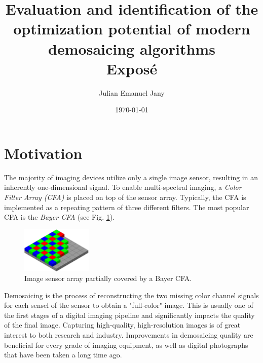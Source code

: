 \documentclass[english,notitlepage,smartquotes]{hgbreport}
\author{Julian Emanuel Jany}                     %
\title{Evaluation and identification of the optimization potential of modern demosaicing algorithms \\ %
			 \textbf{Exposé}}
\date{\today}
\begin{document}
\maketitle



\section{Motivation}

The majority of imaging devices utilize only a single image sensor, resulting in an inherently one-dimensional signal. 
To enable multi-spectral imaging, a \emph{Color Filter Array (CFA)} is placed on top of the sensor array. 
Typically, the CFA is implemented as a repeating pattern of three different filters. 
The most popular CFA is the \emph{Bayer CFA} (see Fig. \ref{fig:bayer_cfa}).

\begin{figure}[h]
	\centering
	\includegraphics[width=0.3\textwidth]{bayer_pattern}
\caption{Image sensor array partially covered by a Bayer CFA. \cite{BayerCFA}}
\label{fig:bayer_cfa}
\end{figure}

Demosaicing is the process of reconstructing the two missing color channel signals for each sensel of the sensor to obtain a "full-color" image. 
This is usually one of the first stages of a digital imaging pipeline and significantly impacts the quality of the final image. 
Capturing high-quality, high-resolution images is of great interest to both research and industry. %
Improvements in demosaicing quality are beneficial for every grade of imaging equipment, as well as digital photographs that have been taken a long time ago. 
\end{document}
